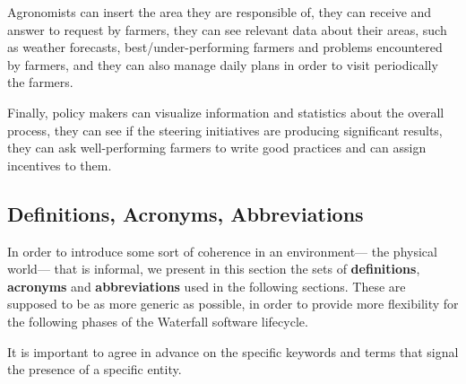Agronomists can insert the area they are responsible of, they can receive and answer to request by farmers, they can see relevant data about their areas, such as weather forecasts, best/under-performing farmers and problems encountered by farmers, and they can also manage daily plans in order to visit periodically the farmers.

Finally, policy makers can visualize information and statistics about the overall process, they can see if the steering initiatives are producing significant results, they can ask well-performing farmers to write good practices and can assign incentives to them.



\subsection{Definitions, Acronyms, Abbreviations}
\label{sec:def_acr_abr}
In order to introduce some sort of coherence in an environment--- the physical world--- that is informal, we present in this section the sets of \textbf{definitions}, \textbf{acronyms} and \textbf{abbreviations} used in the following sections. These are supposed to be as more generic as possible, in order to provide more flexibility for the following phases of the Waterfall software lifecycle.

It is important to agree in advance on the specific keywords and terms that signal the presence of a specific entity.

